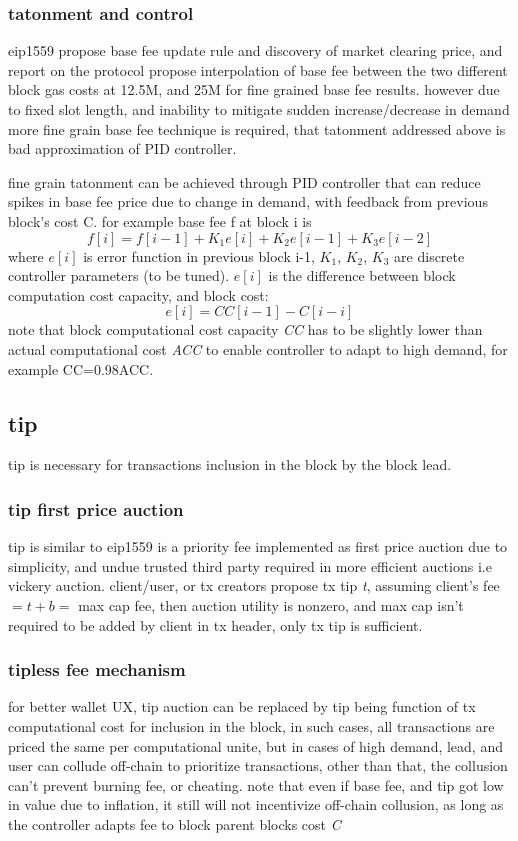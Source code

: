 \documentclass{article}
\begin{document}
\subsubsection{ tatonment and control}
eip1559 \cite{eip1559} propose base fee update rule and discovery of market clearing price, and report on the protocol \cite{eip1559_report} propose interpolation of base fee between the two different block gas costs at 12.5M, and 25M for fine grained base fee results.
however due to fixed slot length, and inability to mitigate sudden increase/decrease in demand more fine grain base fee technique is required, that tatonment addressed above is bad approximation of PID controller.

 fine grain tatonment can be achieved through PID controller that can reduce spikes in base fee price due to change in demand, with feedback from previous block's cost C.
 for example base fee f at block i is $$ f[i] = f[i-1] + K_1e[i] + K_2 e[i-1] + K_3e[i-2] $$
 where $e[i]$ is error function in previous block i-1, $K_1$, $K_2$, $K_3$ are discrete controller parameters (to be tuned).
 $e[i]$ is the difference between block computation cost capacity, and block cost:
 $$ e[i] = CC[i-1] - C[i-i]$$
 note that block computational cost capacity \emph{CC} has to be slightly lower than actual computational cost \emph{ACC} to enable controller to adapt to high demand, for example CC=0.98ACC.

 \subsection{tip}
 tip is necessary for transactions inclusion in the block by the block lead.

\subsubsection{ tip first price auction}
 tip is similar to eip1559 is a priority fee implemented as first price auction due to simplicity, and undue trusted third party required in more efficient auctions i.e vickery auction.
 client/user, or tx creators propose tx tip \emph{t}, assuming client's fee $ = t+b = $ max cap fee, then auction utility is nonzero, and max cap isn't required to be added by client in tx header, only tx tip is sufficient.

 \subsubsection {tipless fee mechanism}
for better wallet UX, tip auction can be replaced by tip being function of tx computational cost for inclusion in the block, in such cases, all transactions are priced the same per computational unite, but in cases of high demand, lead, and user can collude off-chain to prioritize transactions, other than that, the collusion can't prevent burning fee, or cheating.
note that even if base fee, and tip got low in value due to inflation, it still will not incentivize off-chain collusion, as long as the controller adapts fee to block parent blocks cost \emph{C}
\end{document}
